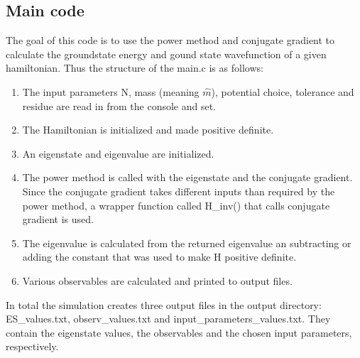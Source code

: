 \documentclass{article}
\begin{document}
\subsection{Main code}\label{main}
The goal of this code is to use the power method and conjugate gradient to calculate the groundstate energy and gound state wavefunction of a given hamiltonian. 
Thus the structure of the main.c is as follows:
\begin{enumerate}
    \item The input parameters N, mass (meaning $\hat{m}$), potential choice, tolerance and residue are read in from the console and set.
    \item The Hamiltonian is initialized and made positive definite.
    \item An eigenstate and eigenvalue are initialized.
    \item The power method is called with the eigenstate and the conjugate gradient. Since the conjugate gradient takes different inputs than required by the power method, a wrapper function called {\selectfont H\_inv()} that calls conjugate gradient is used.
    \item The eigenvalue is calculated from the returned eigenvalue an subtracting or adding the constant that was used to make H positive definite.
    \item Various observables are calculated and printed to output files.
\end{enumerate}
In total the simulation creates three output files in the output directory: {\selectfont ES\_values.txt, observ\_values.txt} and {\selectfont input\_parameters\_values.txt}. They contain the eigenstate values, the observables and the chosen input parameters, respectively.\\
\\
\end{document}

